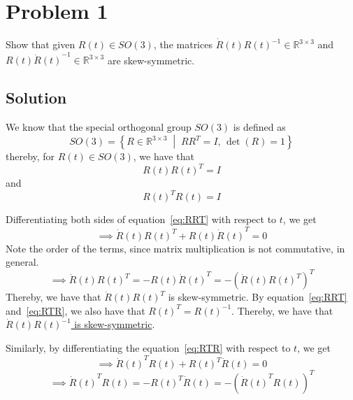 \section*{Problem 1}
\setcounter{section}{1}

Show that given \( R(t) \in SO(3) \), the matrices \( \dot{R}(t) {R(t)}^{-1} \in \mathbb{R}^{3 \times 3} \) and \( R(t) {\dot{R}(t)}^{-1} \in \mathbb{R}^{3 \times 3} \) are skew-symmetric.

\subsection*{Solution}

We know that the special orthogonal group \( SO(3) \) is defined as
\begin{equation*}
    SO(3) = \left \{ R \in \mathbb{R}^{3 \times 3} \; \middle| \; R R^{T} = I, \, \det(R) = 1 \right \}
\end{equation*}
thereby, for \( R(t) \in SO(3) \), we have that
\begin{equation}\label{eq:RRT}
    R(t) {R(t)}^{T} = I
\end{equation}
and
\begin{equation}\label{eq:RTR}
    {R(t)}^{T} R(t) = I
\end{equation}

Differentiating both sides of equation~\eqref{eq:RRT} with respect to \( t \), we get
\begin{equation*}
    \implies
    \dot{R}(t) {R(t)}^{T}
    + R(t) {\dot{R}(t)}^{T}
    = 0
\end{equation*}
Note the order of the terms, since matrix multiplication is not commutative, in general.
\begin{equation*}
    \implies
    \dot{R}(t) {R(t)}^{T}
    =
    -R(t) {\dot{R}(t)}^{T}
    =
    - {\left( \dot{R}(t) {R(t)}^{T} \right)}^{T}
\end{equation*}
Thereby, we have that \( \dot{R}(t) {R(t)}^{T} \) is skew-symmetric.
By equation~\eqref{eq:RRT} and~\eqref{eq:RTR}, we also have that \( {R(t)}^{T} = {R(t)}^{-1} \).
Thereby, we have that \underline{\( \dot{R}(t) {R(t)}^{-1} \) is skew-symmetric}.

Similarly, by differentiating the equation~\eqref{eq:RTR} with respect to \( t \), we get
\begin{equation*}
    \implies
    {\dot{R}(t)}^{T} R(t)
    + {R(t)}^{T} \dot{R}(t)
    = 0
\end{equation*}
\begin{equation*}
    \implies
    {\dot{R}(t)}^{T} R(t)
    =
    - {R(t)}^{T} \dot{R}(t)
    =
    - {\left( {\dot{R}(t)}^{T} R(t) \right)}^{T}
\end{equation*}
